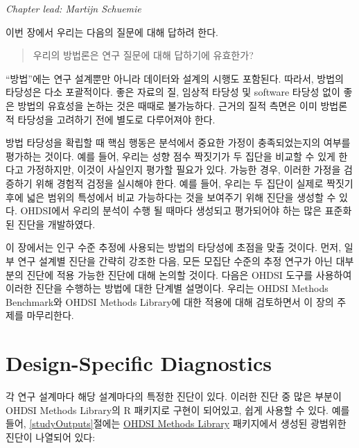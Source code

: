 \documentclass[11pt]{book}
\theoremstyle{definition}
\theoremstyle{definition}
\theoremstyle{definition}
\theoremstyle{remark}
\begin{document}

\emph{Chapter lead: Martijn Schuemie}

이번 장에서 우리는 다음의 질문에 대해 답하려 한다.

\begin{quote}
우리의 방법론은 연구 질문에 대해 답하기에 유효한가?
\end{quote}

``방법''에는 연구 설계뿐만 아니라 데이터와 설계의 시행도 포함된다.
따라서, 방법의 타당성은 다소 포괄적이다. 좋은 자료의 질, 임상적 타당성
및 software 타당성 없이 좋은 방법의 유효성을 논하는 것은 때때로
불가능하다. 근거의 질적 측면은 이미 방법론적 타당성을 고려하기 전에
별도로 다루어져야 한다.

방법 타당성을 확립할 때 핵심 행동은 분석에서 중요한 가정이
충족되었는지의 여부를 평가하는 것이다. 예를 들어, 우리는 성향 점수
짝짓기가 두 집단을 비교할 수 있게 한다고 가정하지만, 이것이 사실인지
평가할 필요가 있다. 가능한 경우, 이러한 가정을 검증하기 위해 경험적
검정을 실시해야 한다. 예를 들어, 우리는 두 집단이 실제로 짝짓기 후에
넓은 범위의 특성에서 비교 가능하다는 것을 보여주기 위해 진단을 생성할 수
있다. OHDSI에서 우리의 분석이 수행 될 때마다 생성되고 평가되어야 하는
많은 표준화된 진단을 개발하였다.

이 장에서는 인구 수준 추정에 사용되는 방법의 타당성에 초점을 맞출
것이다. 먼저, 일부 연구 설계별 진단을 간략히 강조한 다음, 모든 모집단
수준의 추정 연구가 아닌 대부분의 진단에 적용 가능한 진단에 대해 논의할
것이다. 다음은 OHDSI 도구를 사용하여 이러한 진단을 수행하는 방법에 대한
단계별 설명이다. 우리는 OHDSI Methods Benchmark와 OHDSI Methods
Library에 대한 적용에 대해 검토하면서 이 장의 주제를 마무리한다.

\section{Design-Specific Diagnostics}\label{design-specific-diagnostics}


각 연구 설계마다 해당 설계마다의 특정한 진단이 있다. 이러한 진단 중 많은
부분이 OHDSI Methods Library의 R 패키지로 구현이 되어있고, 쉽게 사용할
수 있다. 예를 들어, \ref{studyOutputs}절에는
\href{https://ohdsi.github.io/MethodsLibrary/}{OHDSI Methods Library}
패키지에서 생성된 광범위한 진단이 나열되어 있다:
\end{document}
